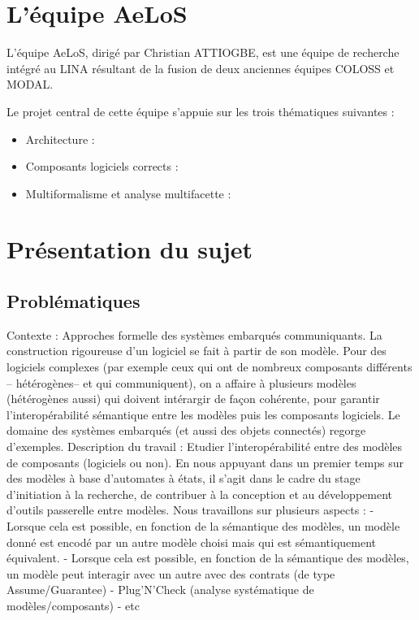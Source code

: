 \documentclass[12pt,a4paper]{report}
\begin{document}
\chapter{L'équipe AeLoS}	

L'équipe AeLoS, dirigé par Christian ATTIOGBE, est une équipe de recherche intégré au LINA résultant de la fusion de deux anciennes équipes COLOSS et MODAL.

Le projet central de cette équipe s'appuie sur les trois thématiques suivantes :
\begin{itemize}
  \item Architecture : 
  \item Composants logiciels corrects : 
  \item Multiformalisme et analyse multifacette : 
\end{itemize}

\chapter{Présentation du sujet}
\section{Problématiques}
Contexte : Approches formelle des systèmes embarqués communiquants.
La construction rigoureuse d'un logiciel se fait à partir de son modèle. Pour des logiciels complexes (par exemple ceux
qui ont de nombreux composants différents -- hétérogènes-- et qui communiquent), on a affaire à plusieurs modèles
(hétérogènes aussi) qui doivent intérargir de façon cohérente, pour garantir l'interopérabilité sémantique entre les
modèles puis les composants logiciels. Le domaine des systèmes embarqués (et aussi des objets connectés) regorge
d'exemples.
Description du travail : Etudier l'interopérabilité entre des modèles de composants (logiciels ou non).
En nous appuyant dans un premier temps sur des modèles à base d'automates à états, il s'agit dans le cadre du stage
d'initiation à la recherche, de contribuer à la conception et au développement d'outils passerelle entre modèles.
Nous travaillons sur plusieurs aspects :
- Lorsque cela est possible, en fonction de la sémantique des modèles, un modèle donné est encodé par un autre
modèle choisi mais qui est sémantiquement équivalent.
- Lorsque cela est possible, en fonction de la sémantique des modèles, un modèle peut interagir avec un autre avec
des contrats (de type Assume/Guarantee)
- Plug'N'Check (analyse systématique de modèles/composants)
- etc
\end{document}
